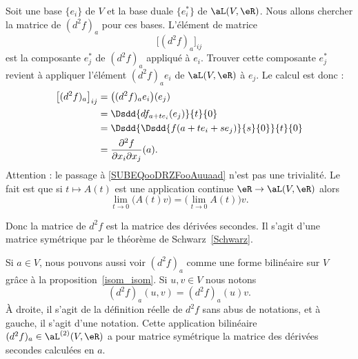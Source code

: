 Soit une base \( \{ e_i \}\) de \( V\) et la base duale \( \{ e_i^* \}\) de \( \aL(V,\eR)\). Nous allons chercher la matrice de \( (d^2f)_a\) pour ces bases. L'élément de matrice
\begin{equation}
	\big[ (d^2f)_a \big]_{ij}
\end{equation}
est la composante \( e_j^*\) de \( (d^2f)_a\) appliqué à \( e_i\). Trouver cette composante \( e_j^*\) revient à appliquer l'élément \( (d^2f)_ae_i\) de \( \aL(V,\eR)\) à \( e_j\). Le calcul est donc :
\begin{subequations}
	\begin{align}
		\big[ (d^2f)_{a} \big]_{ij} & =\big( (d^2f)_ae_i \big)(e_j)                                      \\
		                            & =\Dsdd{ df_{a+te_i}(e_j) }{t}{0}       \label{SUBEQooDRZFooAuuaad} \\
		                            & =\Dsdd{    \Dsdd{ f(a+te_i+se_j) }{s}{0}    }{t}{0}                \\
		                            & =\frac{ \partial^2f }{ \partial x_i\partial x_j }(a).
	\end{align}
\end{subequations}
Attention : le passage à \eqref{SUBEQooDRZFooAuuaad} n'est pas une trivialité. Le fait est que si \( t\mapsto A(t)\) est une application continue \( \eR\to \aL(V,\eR)\) alors
\begin{equation}
	\lim_{t\to 0} \big( A(t)v \big)=\big( \lim_{t\to 0} A(t) \big)v.
\end{equation}

Donc la matrice de \( d^2f  \) est la matrice des dérivées secondes. Il s'agit d'une matrice symétrique par le théorème de Schwarz~\ref{Schwarz}.

\begin{normaltext}      \label{NORMooZAOEooGqjpLH}
	Si \( a\in V\), nous pouvons aussi voir \( (d^2f)_a\) comme une forme bilinéaire sur \( V\) grâce à la proposition~\ref{isom_isom}. Si \( u,v\in V\) nous notons
	\begin{equation}
		(d^2f)_a(u,v)=(d^2f)_a(u)v.
	\end{equation}
	À droite, il s'agit de la définition réelle de \( d^2f\) sans abus de notations, et à gauche, il s'agit d'une notation. Cette application bilinéaire \( (d^2f)_a\in \aL^{(2)}(V,\eR)\) a pour matrice symétrique la matrice des dérivées secondes calculées en \( a\).
\end{normaltext}

